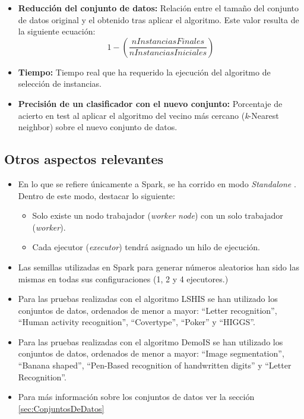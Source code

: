 \begin{itemize}
	\item \textbf{Reducción del conjunto de datos:} Relación entre el tamaño del conjunto de datos original y el obtenido tras aplicar el algoritmo. Este valor resulta de la siguiente ecuación: \[1-(\frac{nInstanciasFinales}{nInstanciasIniciales})\]


	\item \textbf{Tiempo:} Tiempo real que ha requerido la ejecución del algoritmo de selección de instancias.
	\item \textbf{Precisión de un clasificador con el nuevo conjunto:} Porcentaje de acierto en test al aplicar el algoritmo del vecino más cercano (\textit{k}-Nearest neighbor) sobre el nuevo conjunto de datos.
\end{itemize}

\subsection{Otros aspectos relevantes}\label{subsec:otrosLSHISyDemoIS}
 \begin{itemize}
	\item En lo que se refiere únicamente a Spark, se ha corrido en modo \textit{Standalone} \cite{StandaloneSpark}. Dentro de este modo, destacar lo siguiente:
	\begin{itemize}
		\item Solo existe un nodo trabajador (\textit{worker node}) con un solo trabajador (\textit{worker}).
		\item Cada ejecutor (\textit{executor}) tendrá asignado un hilo de ejecución.
	\end{itemize}
	\item Las semillas utilizadas en Spark para generar números aleatorios han sido las mismas en todas sus configuraciones (1, 2 y 4 ejecutores.)
	\item Para las pruebas realizadas con el algoritmo LSHIS se han utilizado los conjuntos de datos, ordenados de menor a mayor: ``Letter recognition'', ``Human activity recognition'', ``Covertype'', ``Poker'' y ``HIGGS''.
	\item Para las pruebas realizadas con el algoritmo DemoIS se han utilizado los conjuntos de datos, ordenados de menor a mayor:  ``Image segmentation'', ``Banana shaped'', ``Pen-Based recognition of handwritten digits'' y ``Letter Recognition''.
	\item Para más información sobre los conjuntos de datos ver la sección \ref{sec:ConjuntosDeDatos}
 \end{itemize}


